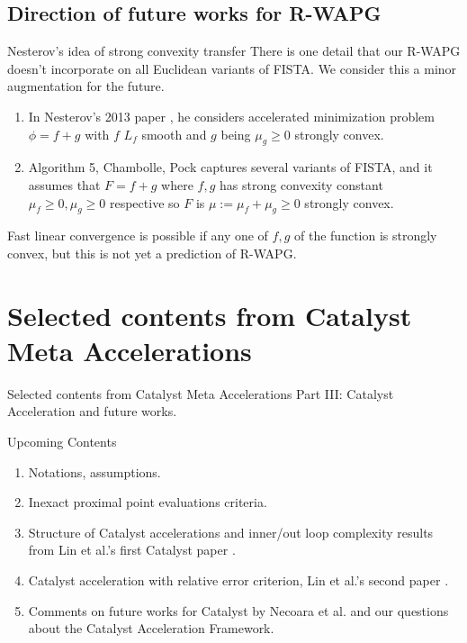 \documentclass[11pt]{beamer}
\theoremstyle{definition}
\begin{document}
    \subsection{Direction of future works for R-WAPG}
        \begin{frame}{Nesterov's idea of strong convexity transfer}
            There is one detail that our R-WAPG doesn't incorporate on all Euclidean variants of FISTA. 
            We consider this a minor augmentation for the future. 
            \begin{enumerate}
                \item In Nesterov's 2013 paper \cite{nesterov_gradient_2013}, he considers accelerated  minimization problem $\phi = f + g$ with $f$ $L_f$ smooth and $g$ being $\mu_g \ge 0$ strongly convex. 
                \item Algorithm 5, Chambolle, Pock \cite{chambolle_introduction_2016} captures several variants of FISTA, and it assumes that $F = f + g$ where $f, g$ has strong convexity constant $\mu_f \ge 0, \mu_g \ge 0$ respective so $F$ is $\mu := \mu_f + \mu_g \ge 0$ strongly convex. 
            \end{enumerate}
            Fast linear convergence is possible if any one of $f, g$ of the function is strongly convex, but this is not yet a prediction of R-WAPG. 
        \end{frame}
        
\section{Selected contents from Catalyst Meta Accelerations}
    \begin{frame}{Selected contents from Catalyst Meta Accelerations}
        Part III: Catalyst Acceleration and future works. 
        \begin{block}{Upcoming Contents}
            \begin{enumerate}
                \item Notations, assumptions. 
                \item Inexact proximal point evaluations criteria. 
                \item Structure of Catalyst accelerations and inner/out loop complexity results from Lin et al.'s first Catalyst paper \cite{lin_universal_2015}. 
                \item Catalyst acceleration with relative error criterion, Lin et al.'s second paper \cite{lin_catalyst_2018}.
                \item Comments on future works for Catalyst by Necoara et al. \cite{necoara_linear_2019} and our questions about the Catalyst Acceleration Framework. 
            \end{enumerate}
        \end{block}
    \end{frame}
\end{document}
